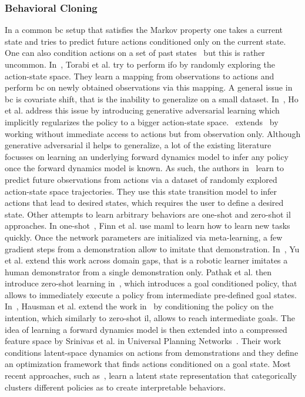 \subsubsection{Behavioral Cloning}
In a common \gls{bc} setup that satisfies the Markov property one takes a current state and tries to predict future actions conditioned only on the current state. One can also condition actions on a set of past states~\cite{xu2017end} but this is rather uncommon. In~\cite{torabi2018behavioral}, Torabi et al. try to perform \gls{ifo} by randomly exploring the action-state space. They learn a mapping from observations to actions and perform \gls{bc} on newly obtained observations via this mapping. A general issue in \gls{bc} is covariate shift, that is the inability to generalize on a small dataset. In~\cite{ho2016generative}, Ho et al. address this issue by introducing generative adversarial learning which implicitly regularizes the policy to a bigger action-state space.~\cite{torabi2018generative} extends~\cite{ho2016generative} by working without immediate access to actions but from observation only. Although generative adversarial \gls{il} helps to generalize, a lot of the existing literature focusses on learning an underlying forward dynamics model to infer any policy once the forward dynamics model is known. As such, the authors in~\cite{finn2016unsupervised, finn2017deep, nair2017combining} learn to predict future observations from actions via a dataset of randomly explored action-state space trajectories. They use this state transition model to infer actions that lead to desired states, which requires the user to define a desired state. Other attempts to learn arbitrary behaviors are one-shot and zero-shot \gls{il} approaches. In one-shot~\cite{finn2017one}, Finn et al. use \gls{maml} to learn how to learn new tasks quickly. Once the network parameters are initialized via meta-learning, a few gradient steps from a demonstration allow to imitate that demonstration. In~\cite{yu2018one}, Yu et al. extend this work across domain gaps, that is a robotic learner imitates a human demonstrator from a single demonstration only. Pathak et al. then introduce zero-shot learning in~\cite{pathak2018zero}, which introduces a goal conditioned policy, that allows to immediately execute a policy from intermediate pre-defined goal states. In~\cite{hausman2017multi}, Hausman et al. extend the work in~\cite{ho2016generative} by conditioning the policy on the intention, which similarly to zero-shot \gls{il}, allows to reach intermediate goals. The idea of learning a forward dynamics model is then extended into a compressed feature space by Srinivas et al. in Universal Planning Networks~\cite{srinivas2018universal}. Their work conditions latent-space dynamics on actions from demonstrations and they define an optimization framework that finds actions conditioned on a goal state. Most recent approaches, such as~\cite{lynch2020learning}, learn a latent state representation that categorically clusters different policies as to create interpretable behaviors.


